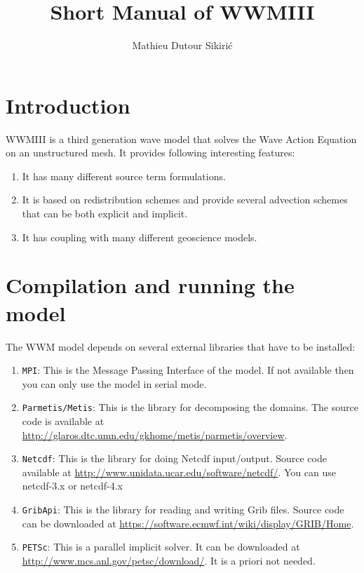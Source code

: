 \documentclass[12pt]{amsart}
\begin{document}
\author{Mathieu Dutour Sikiri\'c}
\address{Mathieu Dutour Sikiri\'c, Rudjer Boskovi\'c Institute, Bijenicka 54, 10000 Zagreb, Croatia}


\title{Short Manual of WWMIII}
\date{}

\maketitle


\section{Introduction}
WWMIII is a third generation wave model that solves the Wave Action Equation on an unstructured mesh.
It provides following interesting features:
\begin{enumerate}
\item It has many different source term formulations.
\item It is based on redistribution schemes and provide several advection
  schemes that can be both explicit and implicit.
\item It has coupling with many different geoscience models.
\end{enumerate}



\section{Compilation and running the model}

The WWM model depends on several external libraries that have to be installed:
\begin{enumerate}
\item {\tt MPI}: This is the Message Passing Interface of the model. If not available
  then you can only use the model in serial mode.
\item {\tt Parmetis/Metis}: This is the library for decomposing the domains. The source
  code is available at \url{http://glaros.dtc.umn.edu/gkhome/metis/parmetis/overview}.
\item {\tt Netcdf}: This is the library for doing Netcdf input/output. Source code available at
  \url{http://www.unidata.ucar.edu/software/netcdf/}. You can use netcdf-3.x or netcdf-4.x
\item {\tt GribApi}: This is the library for reading and writing Grib files. Source code
  can be downloaded at \url{https://software.ecmwf.int/wiki/display/GRIB/Home}.
\item {\tt PETSc}: This is a parallel implicit solver. It can be downloaded
  at \url{http://www.mcs.anl.gov/petsc/download/}. It is a priori not needed.
\end{enumerate}
\end{document}
